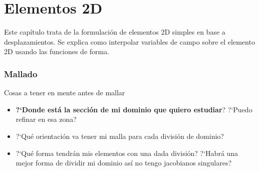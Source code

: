 
\part{Elementos 2D}

Este capítulo trata de la formulación de elementos 2D simples en base a desplazamientos. Se explica como interpolar variables de campo sobre el elemento 2D usando las funciones de forma.


\section{Mallado}
 Cosas a tener en mente antes de mallar
\begin{itemize}
	\item \textbf{?`Donde está la sección de mi dominio que quiero estudiar}? ?`Puedo refinar en esa zona?
	\item ?`Qué orientación va tener mi malla para cada división de dominio?
	\item ?`Qué forma tendrán mis elementos con una dada división? ?`Habrá una mejor forma de dividir mi dominio así no tengo jacobianos singulares?
\end{itemize}


